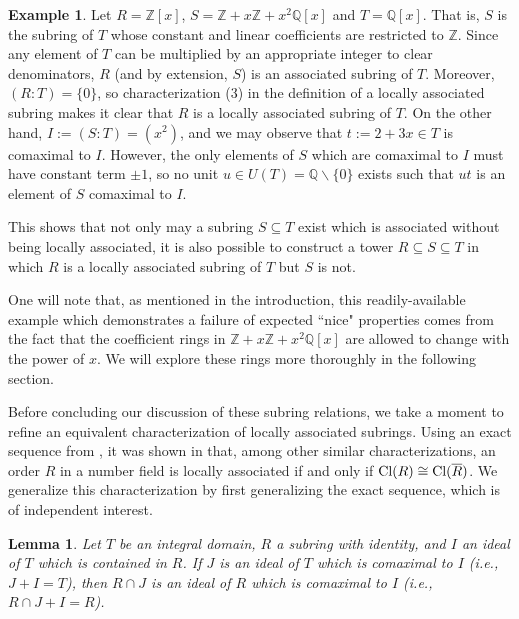 \documentclass[12pt]{amsart}
\newtheorem{lemma}[theorem]{Lemma}
\theoremstyle{definition}
\newtheorem{example}[theorem]{Example}
\newcommand{\bZ}{\mathbb Z}
\newcommand{\bQ}{\mathbb Q}
\newcommand{\Rbar}{{\overline{R}}}
\newcommand{\Cl}{\textup{Cl}}
\begin{document}
\begin{example}
    \label{leading example}
    Let $R=\bZ[x]$, $S=\bZ+x\bZ+x^2\bQ[x]$ and $T=\bQ[x]$. That is, $S$ is the subring of $T$ whose constant and linear coefficients are restricted to $\bZ$. Since any element of $T$ can be multiplied by an appropriate integer to clear denominators, $R$ (and by extension, $S$) is an associated subring of $T$. Moreover, $(R:T)=\{0\}$, so characterization (3) in the definition of a locally associated subring makes it clear that $R$ is a locally associated subring of $T$. On the other hand, $I:=(S:T)=(x^2)$, and we may observe that $t:=2+3x\in T$ is comaximal to $I$. However, the only elements of $S$ which are comaximal to $I$ must have constant term $\pm 1$, so no unit $u\in U(T)=\bQ\backslash\{0\}$ exists such that $ut$ is an element of $S$ comaximal to $I$.

    This shows that not only may a subring $S\subseteq T$ exist which is associated without being locally associated, it is also possible to construct a tower $R\subseteq S\subseteq T$ in which $R$ is a locally associated subring of $T$ but $S$ is not.
\end{example}

One will note that, as mentioned in the introduction, this readily-available example which demonstrates a failure of expected ``nice" properties comes from the fact that the coefficient rings in $\bZ+x\bZ+x^2\bQ[x]$ are allowed to change with the power of $x$. We will explore these rings more thoroughly in the following section.

Before concluding our discussion of these subring relations, we take a moment to refine an equivalent characterization of locally associated subrings. Using an exact sequence from \cite[Proposition 12.9]{neukirch}, it was shown in \cite[Theorem 3.4]{subringrelations} that, among other similar characterizations, an order $R$ in a number field is locally associated if and only if $\Cl(R)\cong \Cl(\Rbar)$. We generalize this characterization by first generalizing the exact sequence, which is of independent interest.

\begin{lemma}
    \label{comaximal intersection}
    Let $T$ be an integral domain, $R$ a subring with identity, and $I$ an ideal of $T$ which is contained in $R$. If $J$ is an ideal of $T$ which is comaximal to $I$ (i.e., $J+I=T$), then $R\cap J$ is an ideal of $R$ which is comaximal to $I$ (i.e., $R\cap J+I=R$).
\end{lemma}
\end{document}
